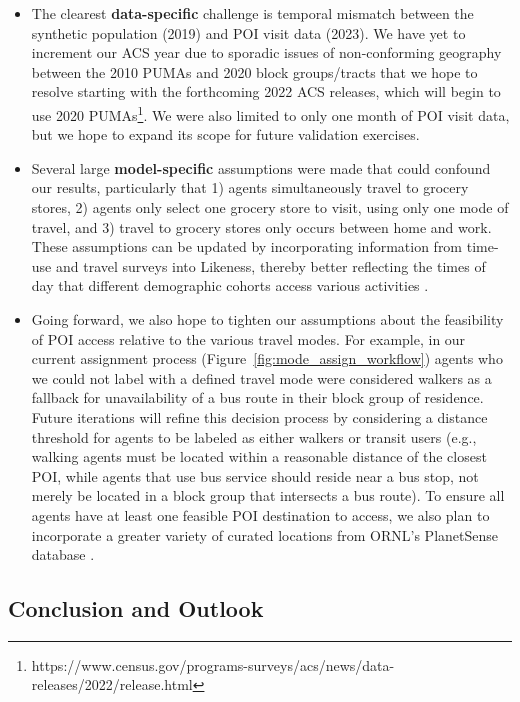 \begin{itemize}
    \item The clearest \textbf{data-specific} challenge is temporal mismatch between the synthetic population (2019) and POI visit data (2023). We have yet to increment our ACS year due to sporadic issues of non-conforming geography between the 2010 PUMAs and 2020 block groups/tracts that we hope to resolve starting with the forthcoming 2022 ACS releases, which will begin to use 2020 PUMAs\footnote{https://www.census.gov/programs-surveys/acs/news/data-releases/2022/release.html}. We were also limited to only one month of POI visit data, but we hope to expand its scope for future validation exercises.
    \item Several large \textbf{model-specific} assumptions were made that could confound our results, particularly that 1) agents simultaneously travel to grocery stores, 2) agents only select one grocery store to visit, using only one mode of travel, and 3) travel to grocery stores only occurs between home and work. These assumptions can be updated by incorporating information from time-use and travel surveys into Likeness, thereby better reflecting the times of day that different demographic cohorts access various activities \cite{macal2018chisim}.
    \item Going forward, we also hope to tighten our assumptions about the feasibility of POI access relative to the various travel modes. For example, in our current assignment process (Figure~\ref{fig:mode_assign_workflow}) agents who we could not label with a defined travel mode were considered walkers as a fallback for unavailability of a bus route in their block group of residence. Future iterations will refine this decision process by considering a distance threshold for agents to be labeled as either walkers or transit users (e.g., walking agents must be located within a reasonable distance of the closest POI, while agents that use bus service should reside near a bus stop, not merely be located in a block group that intersects a bus route). To ensure all agents have at least one feasible POI destination to access, we also plan to incorporate a greater variety of curated locations from ORNL's PlanetSense database \cite{thakur2015planetsense}. 
\end{itemize}


\subsection{Conclusion and Outlook}\label{section:conclusion-outlook}

